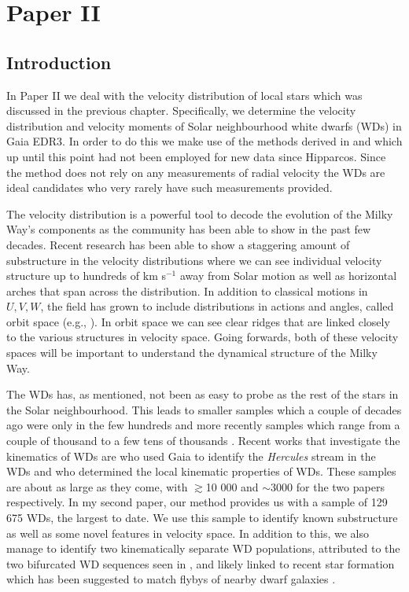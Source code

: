 \chapter{Paper II}\label{chap:paper2}
\section{Introduction}\label{sec:p2-intro}
In Paper II we deal with the velocity distribution of local stars which was discussed in the previous chapter. Specifically, we determine the velocity distribution and velocity moments of Solar neighbourhood white dwarfs (WDs) in Gaia EDR3. In order to do this we make use of the methods derived in \cite{dehnen:98a} and \cite{dehnen:98b} which up until this point had not been employed for new data since Hipparcos. Since the method does not rely on any measurements of radial velocity the WDs are ideal candidates who very rarely have such measurements provided. 

The velocity distribution is a powerful tool to decode the evolution of the Milky Way's components as the community has been able to show in the past few decades. Recent research has been able to show a staggering amount of substructure in the velocity distributions \citep{antoja:12, kushniruk:17, dr2:kinematics} where we can see individual velocity structure up to hundreds of km s$^{-1}$ away from Solar motion as well as horizontal arches that span across the distribution. In addition to classical motions in $U, V, W$, the field has grown to include distributions in actions and angles, called orbit space (e.g., \citealt{trick:19, trick:21, trick:22}). In orbit space we can see clear ridges that are linked closely to the various structures in velocity space. Going forwards, both of these velocity spaces will be important to understand the dynamical structure of the Milky Way.

The WDs has, as mentioned, not been as easy to probe as the rest of the stars in the Solar neighbourhood. This leads to smaller samples which a couple of decades ago were only in the few hundreds \citep{sion:77, sion:88} and more recently samples which range from a couple of thousand to a few tens of thousands \citep{rowell:11, anguiano:17}. Recent works that investigate the kinematics of WDs are \cite{torres:19} who used Gaia to identify the \textit{Hercules} stream in the WDs and \cite{raddi:22} who determined the local kinematic properties of WDs. These samples are about as large as they come, with {$\gtrsim$}10 000 and {$\sim$}3000 for the two papers respectively. In my second paper, our method provides us with a sample of 129 675 WDs, the largest to date. We use this sample to identify known substructure as well as some novel features in velocity space. In addition to this, we also manage to identify two kinematically separate WD populations, attributed to the two bifurcated WD sequences seen in \cite{dr2:hr}, and likely linked to recent star formation which has been suggested to match flybys of nearby dwarf galaxies \citep{ruiz-lara:20}. 

